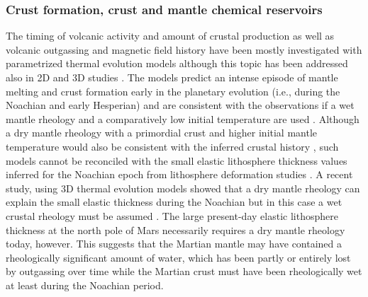 \subsubsection{Crust formation, crust and mantle chemical reservoirs}
\label{Crust formation}
The timing of volcanic activity and amount of crustal production as well as volcanic outgassing and magnetic field history have been mostly investigated with parametrized thermal evolution models \citep[e.g.,][]{Hauck2002, Breuer2003, Breuer2006, Schumacher2006, Fraeman2010, Morschhauser2011, Grott2011} although this topic has been addressed also in 2D and 3D studies \citep[e.g.,][]{Ruedas2013, Plesa2014a, Sekhar2014}. The models predict an intense episode of mantle melting and crust formation early in the planetary evolution (i.e., during the Noachian and early Hesperian) and are consistent with the observations if a wet mantle rheology and a comparatively low initial temperature are used \citep[e.g.,][]{Hauck2002, Breuer2006, Fraeman2010, Morschhauser2011, Grott2011}. Although a dry mantle rheology with a primordial crust and higher initial mantle temperature would also be consistent with the inferred crustal history \citep{Breuer2006}, such models cannot be reconciled with the small elastic lithosphere thickness values inferred for the Noachian epoch from lithosphere deformation studies \citep{Grott2008, Grott2013}. A recent study, using 3D thermal evolution models showed that a dry mantle rheology can explain the small elastic thickness during the Noachian but in this case a wet crustal rheology must be assumed \citep{Breuer2016}. The large present-day elastic lithosphere thickness at the north pole of Mars necessarily requires a dry mantle rheology today, however. This suggests that the Martian mantle may have contained a rheologically significant amount of water, which has been partly or entirely lost by outgassing over time while  the Martian crust must have been rheologically wet at least during the Noachian period.   

